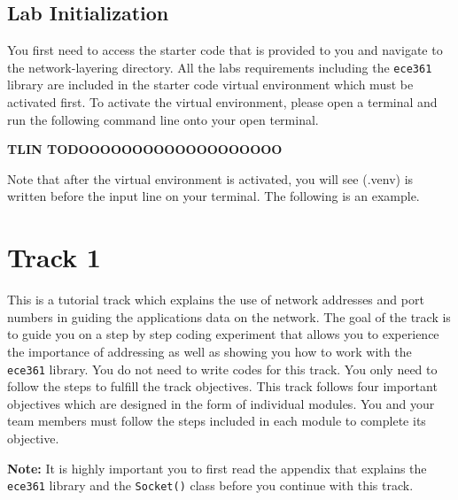 \documentclass[11pt]{article}
\begin{document}
\subsection{Lab Initialization}
\label{subsec:lab-init}
You first need to access the starter code that is provided to you and navigate to the network-layering directory. All the labs requirements including the \texttt{ece361} library are included in the starter code virtual environment which must be activated first. To activate the virtual environment, please open a terminal and run the following command line onto your open terminal.

\textbf{TLIN TODOOOOOOOOOOOOOOOOOOO}

Note that after the virtual environment is activated, you will see (.venv) is written before the input line on your terminal. The following is an example.



\section{Track 1}
\label{sec:track1}
This is a tutorial track which explains the use of network addresses and port numbers in guiding the applications data on the network. The goal of the track is to guide you on a step by step coding experiment that allows you to experience the importance of addressing as well as showing you how to work with the \texttt{ece361} library. You do not need to write codes for this track. You only need to follow the steps to fulfill the track objectives. This track follows four important objectives which are designed in the form of individual modules. You and your team members must follow the steps included in each module to complete its objective.

\textbf{Note:}
It is highly important you to first read the appendix that explains the \texttt{ece361} library and the \texttt{Socket()} class before you continue with this track.

\end{document}
